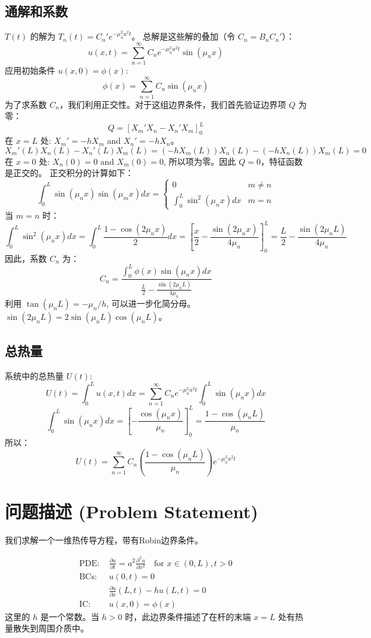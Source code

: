 \documentclass{article}
\begin{document}
	\subsection*{通解和系数}
	$T(t)$ 的解为 $T_n(t) = C_n' e^{-\mu_n^2 a^2 t}$。
	总解是这些解的叠加（令 $C_n = B_n C_n'$）：
	$$ u(x,t) = \sum_{n=1}^{\infty} C_n e^{-\mu_n^2 a^2 t} \sin(\mu_n x) $$
	应用初始条件 $u(x,0) = \phi(x)$:
	$$ \phi(x) = \sum_{n=1}^{\infty} C_n \sin(\mu_n x) $$
	为了求系数 $C_n$，我们利用正交性。对于这组边界条件，我们首先验证边界项 $Q$ 为零：
	$$ Q = [X_m' X_n - X_n' X_m]_0^L $$
	在 $x=L$ 处: $X_m' = -hX_m$ and $X_n' = -hX_n$。
	$$ X_m'(L)X_n(L) - X_n'(L)X_m(L) = (-hX_m(L))X_n(L) - (-hX_n(L))X_m(L) = 0 $$
	在 $x=0$ 处: $X_n(0)=0$ and $X_m(0)=0$, 所以项为零。因此 $Q=0$，特征函数是正交的。
	正交积分的计算如下：
	$$ \int_0^L \sin(\mu_n x) \sin(\mu_m x) dx = 
	\begin{cases}
		0 & m \neq n \\
		\int_0^L \sin^2(\mu_n x) dx & m=n
	\end{cases}
	$$
	当 $m=n$ 时：
	$$ \int_0^L \sin^2(\mu_n x) dx = \int_0^L \frac{1-\cos(2\mu_n x)}{2} dx = \left[ \frac{x}{2} - \frac{\sin(2\mu_n x)}{4\mu_n} \right]_0^L = \frac{L}{2} - \frac{\sin(2\mu_n L)}{4\mu_n} $$
	因此，系数 $C_n$ 为：
	$$ C_n = \frac{\int_0^L \phi(x) \sin(\mu_n x) dx}{\frac{L}{2} - \frac{\sin(2\mu_n L)}{4\mu_n}} $$
	利用 $\tan(\mu_n L) = -\mu_n/h$, 可以进一步化简分母。$\sin(2\mu_n L) = 2\sin(\mu_n L)\cos(\mu_n L)$。
	
	\subsection*{总热量}
	系统中的总热量 $U(t)$:
	$$ U(t) = \int_0^L u(x,t) dx = \sum_{n=1}^{\infty} C_n e^{-\mu_n^2 a^2 t} \int_0^L \sin(\mu_n x) dx $$
	$$ \int_0^L \sin(\mu_n x) dx = \left[ -\frac{\cos(\mu_n x)}{\mu_n} \right]_0^L = \frac{1-\cos(\mu_n L)}{\mu_n} $$
	所以：
	$$ U(t) = \sum_{n=1}^{\infty} C_n \left( \frac{1-\cos(\mu_n L)}{\mu_n} \right) e^{-\mu_n^2 a^2 t} $$
	
	\section{问题描述 (Problem Statement)}
	
	我们求解一个一维热传导方程，带有Robin边界条件。
	
	\begin{align*}
		\text{PDE: } & \frac{\partial u}{\partial t} = a^2 \frac{\partial^2 u}{\partial x^2} \quad \text{for } x \in (0, L), t > 0 \\
		\text{BCs: } & u(0, t) = 0 \\
		& \frac{\partial u}{\partial x}(L, t) - h u(L, t) = 0 \\
		\text{IC: }  & u(x, 0) = \phi(x)
	\end{align*}
	这里的 $h$ 是一个常数。当 $h>0$ 时，此边界条件描述了在杆的末端 $x=L$ 处有热量散失到周围介质中。
	
\end{document}
